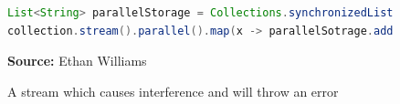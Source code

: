 \documentclass[oneside, 12pt]{article}
\newcommand{\source}[1]{\textbf{Source:} {#1} }
\begin{document}
\begin{figure}[H]
\centering
\begin{lstlisting}[language=Java]
List<String> parallelStorage = Collections.synchronizedList(new ArrayList<>());
collection.stream().parallel().map(x -> parallelSotrage.add(x)).forEachOrdered(x -> System.out.println(x));
\end{lstlisting}
\caption{A stream which causes interference and will throw an error}
\source{Ethan Williams}
\label{fig:stateful}
\end{figure}
 
\printbibliography[heading=bibintoc]
\end{document}

